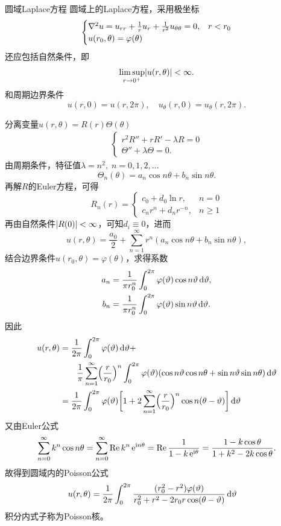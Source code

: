 \begin{example}{圆域Laplace方程}{}
	圆域上的Laplace方程，采用极坐标
	\begin{align*}
		\begin{cases}
			\nabla^2 u = u_{rr} + \frac1ru_r + \frac1{r^2}u_{\theta\theta} = 0,&r < r_0\\
			u(r_0,\theta) = \varphi(\theta)
		\end{cases}
	\end{align*}
	还应包括自然条件，即
	\[
		\limsup_{r\to0^+}\lvert u(r,\theta)\rvert < \infty.
	\]
	和周期边界条件
	\[
		u(r,0) = u(r,2\pi),\quad u_\theta(r,0) = u_\theta(r,2\pi).
	\]
	
	分离变量$u(r,\theta) = R(r)\varTheta(\theta)$
	\begin{align*}
		\begin{cases}
			r^2R'' + rR' - \lambda R = 0\\
			\varTheta'' + \lambda\varTheta = 0.
		\end{cases}
	\end{align*}
	由周期条件，特征值$\lambda = n^2,\;n = 0,1,2,\ldots$
	\[
		\varTheta_n(\theta) = a_n\cos n\theta + b_n\sin n\theta.
	\]
	再解$R$的Euler方程，可得
	\[
		R_n(r) =
		\begin{cases}
			c_0 + d_0\ln r,&n = 0\\
			c_nr^n + d_nr^{-n},&n \geqslant 1
		\end{cases}
	\]
	再由自然条件$\lvert R(0)\rvert < \infty$，可知$d_i \equiv 0$，进而
	\begin{equation}
		\label{eq:mmp-harmonic-disk-series}
		u(r,\theta) = \frac{a_0}2 + \sum_{n=1}^\infty r^n(a_n\cos n\theta + b_n\sin n\theta),
	\end{equation}
	结合边界条件$u(r_0,\theta) = \varphi(\theta)$，求得系数
	\begin{align*}
		a_n &= \frac1{\pi r_0^n}\int_0^{2\pi}\varphi(\vartheta)\cos n\vartheta\mathop{}\!\mathrm{d}\vartheta,\\
		b_n &= \frac1{\pi r_0^n}\int_0^{2\pi}\varphi(\vartheta)\sin n\vartheta\mathop{}\!\mathrm{d}\vartheta.
	\end{align*}
	因此
	\begin{align*}
		u(r,\theta) &= \frac1{2\pi}\int_0^{2\pi}\varphi(\vartheta)\mathop{}\!\mathrm{d}\vartheta +\\
		&\qquad\frac1\pi\sum_{n=1}^\infty\Bigl(\frac r{r_0}\Bigr)^n\int_0^{2\pi}\varphi(\vartheta)(\cos n\vartheta\cos n\theta + \sin n\vartheta\sin n\theta)\mathop{}\!\mathrm{d}\vartheta\\
		&= \frac1{2\pi}\int_0^{2\pi}\varphi(\vartheta)\biggl[1 + 2\sum_{n=1}^\infty\Bigl(\frac r{r_0}\Bigr)^n\cos n(\theta - \vartheta)\biggr]\mathop{}\!\mathrm{d}\vartheta
	\end{align*}
	又由Euler公式
	\begin{align*}
	\sum_{n=0}^\infty k^n\cos n\theta = \sum_{n=0}^\infty\operatorname{Re} k^n\mathop{}\!\mathrm{e}^{\mathrm{i} n\theta} = \operatorname{Re}\frac1{1 - k\mathop{}\!\mathrm{e}^{\mathrm{i}\theta}} = \frac{1 - k\cos\theta}{1 + k^2 - 2k\cos\theta}.
	\end{align*}
	故得到圆域内的Poisson公式
	\begin{align}
		u(r,\theta) &= \frac1{2\pi}\int_0^{2\pi}\frac{(r_0^2 - r^2)\varphi(\vartheta)}{r_0^2 + r^2 - 2r_0r\cos(\theta - \vartheta)}\mathop{}\!\mathrm{d}\vartheta
	\end{align}
	积分内式子称为Poisson核。
\end{example}
